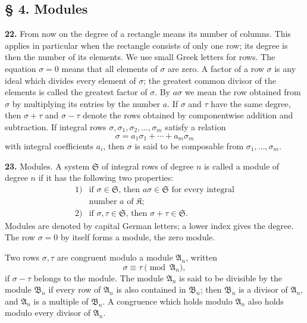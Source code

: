\documentclass[11pt,a4paper]{article}
\newcommand{\K}{\mathfrak K}
\begin{document}
\subsection*{§ 4. Modules}

\textbf{22.} From now on the degree of a rectangle means its number of columns. This applies in particular when the rectangle consists of only one row; its degree is then the number of its elements. We use small Greek letters for rows. The equation \(\sigma=0\) means that all elements of \(\sigma\) are zero. A factor of a row \(\sigma\) is any ideal which divides every element of \(\sigma\); the greatest common divisor of the elements is called the greatest factor of \(\sigma\). By \(a\sigma\) we mean the row obtained from \(\sigma\) by multiplying its entries by the number \(a\). If \(\sigma\) and \(\tau\) have the same degree, then \(\sigma+\tau\) and \(\sigma-\tau\) denote the rows obtained by componentwise addition and subtraction. If integral rows \(\sigma,\sigma_1,\sigma_2,\ldots,\sigma_m\) satisfy a relation
\[
 \sigma=a_1\sigma_1+\cdots+a_m\sigma_m
\]
with integral coefficients \(a_i\), then \(\sigma\) is said to be composable from \(\sigma_1,\ldots,\sigma_m\).

\textbf{23.} Modules. A system \(\mathfrak S\) of integral rows of degree \(n\) is called a module of degree \(n\) if it has the following two properties:
\[
\begin{array}{ll}
1)&\text{if \(\sigma\in\mathfrak S\), then \(a\sigma\in\mathfrak S\) for every integral}\\
&\text{number \(a\) of \(\K\);}\\[2mm]
2)&\text{if \(\sigma,\tau\in\mathfrak S\), then \(\sigma+\tau\in\mathfrak S\).}
\end{array}
\]
Modules are denoted by capital German letters; a lower index gives the degree. The row \(\sigma=0\) by itself forms a module, the zero module.

Two rows \(\sigma,\tau\) are congruent modulo a module \(\mathfrak A_n\), written
\[
 \sigma\equiv\tau\pmod{\mathfrak A_n},
\]
if \(\sigma-\tau\) belongs to the module. The module \(\mathfrak A_n\) is said to be divisible by the module \(\mathfrak B_n\) if every row of \(\mathfrak A_n\) is also contained in \(\mathfrak B_n\); then \(\mathfrak B_n\) is a divisor of \(\mathfrak A_n\), and \(\mathfrak A_n\) is a multiple of \(\mathfrak B_n\). A congruence which holds modulo \(\mathfrak A_n\) also holds modulo every divisor of \(\mathfrak A_n\).
\end{document}

